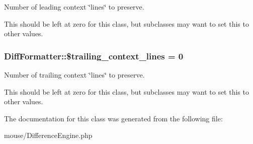 Number of leading context \char`\"{}lines\char`\"{} to preserve.

This should be left at zero for this class, but subclasses may want to set this to other values. \hypertarget{classDiffFormatter_92c948d582a6fc85d10ee9e11393e9b2}{
\subsubsection[{\$trailing\_\-context\_\-lines}]{\setlength{\rightskip}{0pt plus 5cm}DiffFormatter::\$trailing\_\-context\_\-lines = 0}}
\label{classDiffFormatter_92c948d582a6fc85d10ee9e11393e9b2}


Number of trailing context \char`\"{}lines\char`\"{} to preserve.

This should be left at zero for this class, but subclasses may want to set this to other values. 

The documentation for this class was generated from the following file:\begin{CompactItemize}
\item 
mouse/DifferenceEngine.php\end{CompactItemize}
